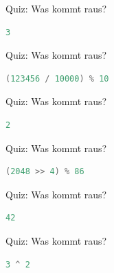 \documentclass[18pt]{beamer}
\begin{document}
\begin{frame}[fragile]{Quiz: Was kommt raus?}
    \begin{block}{}
        \begin{lstlisting}[language=Java]
3
        \end{lstlisting}
    \end{block}
\end{frame}

\begin{frame}[fragile]{Quiz: Was kommt raus?}
    \begin{exampleblock}{}
        \begin{lstlisting}[language=Java]
(123456 / 10000) % 10
        \end{lstlisting}
    \end{exampleblock}
\end{frame}

\begin{frame}[fragile]{Quiz: Was kommt raus?}
    \begin{block}{}
        \begin{lstlisting}[language=Java]
2
        \end{lstlisting}
    \end{block}
\end{frame}

\begin{frame}[fragile]{Quiz: Was kommt raus?}
    \begin{exampleblock}{}
        \begin{lstlisting}[language=Java]
(2048 >> 4) % 86
        \end{lstlisting}
    \end{exampleblock}
\end{frame}

\begin{frame}[fragile]{Quiz: Was kommt raus?}
    \begin{block}{}
        \begin{lstlisting}[language=Java]
42
        \end{lstlisting}
    \end{block}
\end{frame}


\begin{frame}[fragile]{Quiz: Was kommt raus?}
    \begin{exampleblock}{}
        \begin{lstlisting}[language=Java]
3 ^ 2
        \end{lstlisting}
    \end{exampleblock}
\end{frame}
\end{document}
